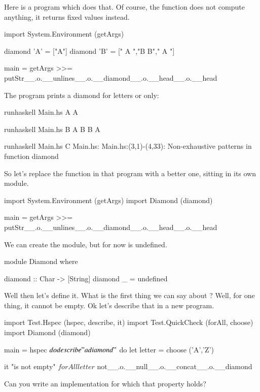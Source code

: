 Here is a program which does that. Of course, the  function does not compute anything, it returns fixed values instead. \\
\begin{haskell}[frame=single,title=Main.hs]
import System.Environment (getArgs)

diamond 'A' = ["A"]
diamond 'B' = [" A ","B B"," A "]

main = getArgs >>= 
    putStr__.o.__unlines__.o.__diamond__.o.__head__.o.__head
\end{haskell}
\answer The program prints a diamond for letters  or  only:
\begin{term}[frame=none]
runhaskell Main.hs A\rk
A

runhaskell Main.hs B\rk
 A
B B
 A

runhaskell Main.hs C\rk
Main.hs: Main.hs:(3,1)-(4,33): 
Non-exhaustive patterns in function diamond
\end{term}
\askN So let's replace the  function in that program with a better one, sitting in its own module.\\
\begin{haskell}[frame=single]
import System.Environment (getArgs)
import Diamond (diamond)

main = getArgs >>= 
    putStr__.o.__unlines__.o.__diamond__.o.__head__.o.__head
\end{haskell}
\answer We can create the module, but for now  is undefined.\\
\begin{haskell}[frame=single,title=Diamond.hs]
module Diamond
where

diamond :: Char -> [String]
diamond _ = undefined
\end{haskell}
\newpage
\askN Well then let's define it. 
What is the first thing we can say about ?
\answer Well, for one thing, it cannot be empty. 
\askN Ok let's describe that in a new program. 
\begin{hspec}[title=Specs.hs]
import Test.Hspec (hspec, describe, it)
import Test.QuickCheck (forAll, choose)
import Diamond (diamond)

main = hspec $ do
    describe "a diamond" $ do
        let letter = choose ('A','Z')

        it "is not empty" $ forAll letter $ 
            not__.o.__null__.o.__concat__.o.__diamond

\end{hspec}
Can you write an implementation for which that property holds?

